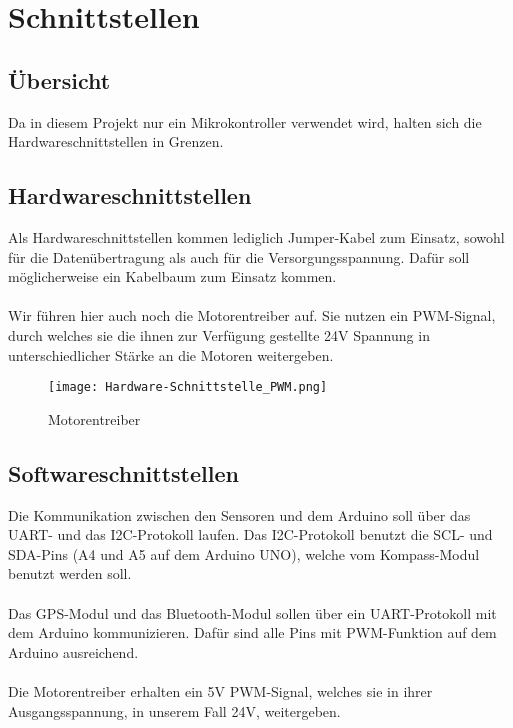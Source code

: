 \section{Schnittstellen}

\subsection{Übersicht}
Da in diesem Projekt nur ein Mikrokontroller verwendet wird, halten sich die Hardwareschnittstellen in Grenzen.

\subsection{Hardwareschnittstellen}
Als Hardwareschnittstellen kommen lediglich Jumper-Kabel zum Einsatz, sowohl für die Datenübertragung als auch für die Versorgungsspannung. Dafür soll möglicherweise ein Kabelbaum zum Einsatz kommen. \\
\\
Wir führen hier auch noch die Motorentreiber auf. Sie nutzen ein PWM-Signal, durch welches sie die ihnen zur Verfügung gestellte 24V Spannung in unterschiedlicher Stärke an die Motoren weitergeben. 

\begin{figure}[H]
    \begin{center}
    \texttt{[image: Hardware-Schnittstelle\_PWM.png]}
    \end{center}
    \caption{Motorentreiber}
\end{figure}

\subsection{Softwareschnittstellen}
Die Kommunikation zwischen den Sensoren und dem Arduino soll über das UART- und das I2C-Protokoll laufen. Das I2C-Protokoll benutzt die SCL- und SDA-Pins (A4 und A5 auf dem Arduino UNO), welche vom Kompass-Modul benutzt werden soll.\\
\\
Das GPS-Modul und das Bluetooth-Modul sollen über ein UART-Protokoll mit dem Arduino kommunizieren. Dafür sind alle Pins mit PWM-Funktion auf dem Arduino ausreichend. \\
\\
Die Motorentreiber erhalten ein 5V PWM-Signal, welches sie in ihrer Ausgangsspannung, in unserem Fall 24V, weitergeben.